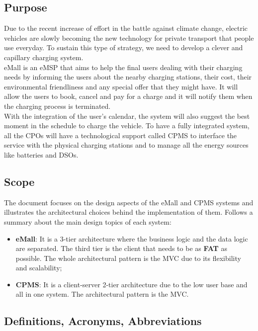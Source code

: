 \subsection{Purpose}
Due to the recent increase of effort in the battle against climate change, electric vehicles are slowly becoming the new technology for private transport that   people use everyday.
To sustain this type of strategy, we need to develop a clever and capillary charging system.\\
\acf{eMall} is an \acf{eMSP} that aims to help the final users dealing with their charging needs by informing the users about the nearby charging stations, their cost, their environmental friendliness and any special offer that they might have.
It will allow the users to book, cancel and pay for a charge and it will notify them when the charging process is terminated.\\
With the integration of the user's calendar, the system will also suggest the best moment in the schedule to charge the vehicle.
To have a fully integrated system, all the \acfp{CPO} will have a technological support called \acf{CPMS} to interface the service with the physical charging stations and to manage all the energy sources like batteries and \acfp{DSO}.
\subsection{Scope}
The document focuses on the design aspects of the \ac{eMall} and \ac{CPMS} systems and illustrates the architectural choices behind the implementation of them. Follows a summary about the main design topics of each system:
\begin{itemize}
    \item \textbf{\ac{eMall}}: It is a 3-tier architecture where the business logic and the data logic are separated. The third tier is the client that needs to be as \textbf{FAT} as possible. The whole architectural pattern is the \ac{MVC} due to its flexibility and scalability;
    \item \textbf{\ac{CPMS}}: It is a client-server 2-tier architecture due to the low user base and all in one system. The architectural pattern is the \ac{MVC}.
\end{itemize}

\subsection{Definitions, Acronyms, Abbreviations}
